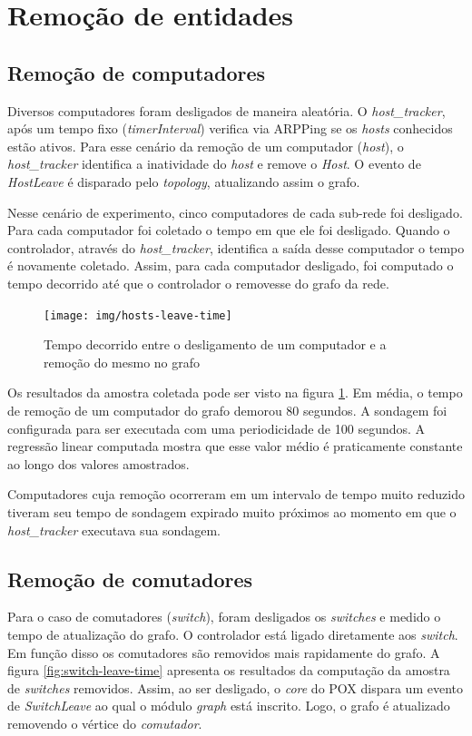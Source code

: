\section{Remoção de entidades}

\subsection{Remoção de computadores}

Diversos computadores foram desligados de maneira aleatória.
O \emph{host\_tracker}, após um tempo fixo (\emph{timerInterval})
verifica via ARPPing se os \emph{hosts} conhecidos estão ativos.
Para esse cenário da remoção de um computador (\emph{host}),
o \emph{host\_tracker} identifica a inatividade do \emph{host} e remove o
\emph{Host}.
O evento de \emph{HostLeave} é disparado pelo \emph{topology},
atualizando assim o grafo.

Nesse cenário de experimento, cinco computadores de cada sub-rede foi desligado.
Para cada computador foi coletado o tempo em que ele foi desligado.
Quando o controlador, através do \emph{host\_tracker}, identifica a saída
desse computador o tempo é novamente coletado.
Assim, para cada computador desligado, foi computado o tempo decorrido até
que o controlador o removesse do grafo da rede.

\begin{figure}[h!]
    \centering
    \label{fig:hosts-leave-time}
    \texttt{[image: img/hosts-leave-time]}
    \caption{Tempo decorrido entre o desligamento de um computador e a
    remoção do mesmo no grafo}
\end{figure}

Os resultados da amostra coletada pode ser visto na figura
\ref{fig:hosts-leave-time}.
Em média, o tempo de remoção de um computador do grafo demorou 80 segundos.
A sondagem foi configurada para ser executada com uma periodicidade de 100
segundos.
A regressão linear computada mostra que esse valor médio é praticamente
constante ao longo dos valores amostrados.

Computadores cuja remoção ocorreram em um intervalo de tempo muito reduzido
tiveram seu tempo de sondagem expirado muito próximos ao momento em que
o \emph{host\_tracker} executava sua sondagem.

\subsection{Remoção de comutadores}

Para o caso de comutadores (\emph{switch}), foram desligados os
\emph{switches} e medido o tempo de atualização do grafo.
O controlador está ligado diretamente aos \emph{switch}.
Em função disso os comutadores são removidos mais rapidamente do grafo.
A figura \ref{fig:switch-leave-time} apresenta os resultados da
computação da amostra de \emph{switches} removidos.
Assim, ao ser desligado, o \emph{core} do POX dispara um evento
de \emph{SwitchLeave} ao qual o módulo \emph{graph} está inscrito.
Logo, o grafo é atualizado removendo o vértice do \emph{comutador}.

